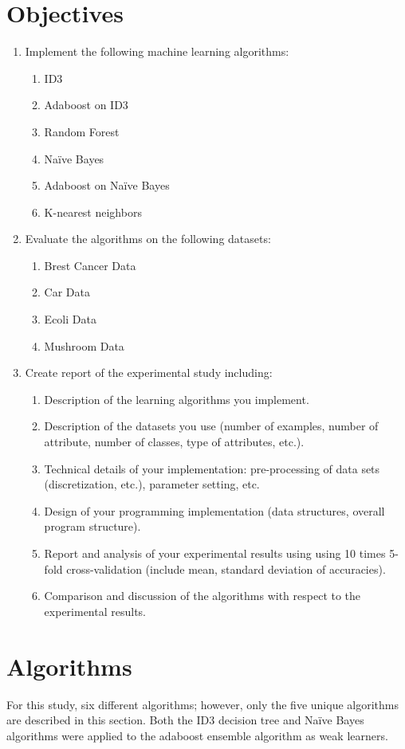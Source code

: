\documentclass[11pt]{article}
\begin{document}
\section{Objectives}
\begin{enumerate}
  \item Implement the following machine learning algorithms:
  \begin{enumerate}
    \item ID3
    \item Adaboost on ID3
    \item Random Forest
    \item Naïve Bayes
    \item Adaboost on Naïve Bayes
    \item K-nearest neighbors
  \end{enumerate}
  \item Evaluate the algorithms on the following datasets:
  \begin{enumerate}
    \item Brest Cancer Data
    \item Car Data
    \item Ecoli Data
    \item Mushroom Data
  \end{enumerate}
  \item Create report of the experimental study including:
  \begin{enumerate}
    \item Description of the learning algorithms you implement.
    \item Description of the datasets you use (number of examples, number of attribute, number of classes, type of attributes, etc.).
    \item Technical details of your implementation: pre-processing of data sets (discretization, etc.), parameter setting, etc.
    \item Design of your programming implementation (data structures, overall program structure).
    \item Report and analysis of your experimental results using using 10 times 5-fold cross-validation (include mean, standard deviation of accuracies).
    \item Comparison and discussion of the algorithms with respect to the experimental results.
  \end{enumerate}
\end{enumerate}

\section{Algorithms}
For this study, six different algorithms; however, only the five unique algorithms are described in this section. Both the ID3 decision tree and Naïve Bayes algorithms were applied to the adaboost ensemble algorithm as weak learners.
\end{document}
